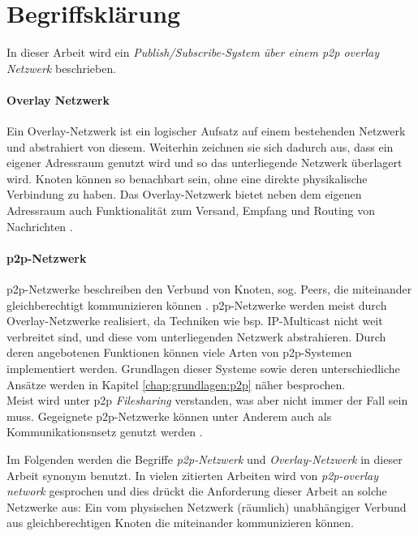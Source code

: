 \section{Begriffsklärung}
In dieser Arbeit wird ein \emph{Publish/Subscribe-System über einem \ac{p2p} overlay Netzwerk} beschrieben.


\paragraph{Overlay Netzwerk} Ein Overlay-Netzwerk ist ein logischer Aufsatz auf einem bestehenden Netzwerk und abstrahiert von diesem. Weiterhin zeichnen sie sich dadurch aus, dass ein eigener Adressraum genutzt wird und so das unterliegende Netzwerk überlagert wird. Knoten können so benachbart sein, ohne eine direkte physikalische Verbindung zu haben. Das Overlay-Netzwerk bietet neben dem eigenen Adressraum auch Funktionalität zum Versand, Empfang und Routing von Nachrichten \cite{Tannenbaum2003}. 

\paragraph{\ac{p2p}-Netzwerk} p2p-Netzwerke beschreiben den Verbund von Knoten, sog. Peers, die miteinander gleichberechtigt kommunizieren können \cite{Steinmetz2005}. p2p-Netzwerke werden meist durch Overlay-Netzwerke realisiert, da Techniken wie bsp. IP-Multicast \cite{Deering1990Multicast} nicht weit verbreitet sind, und diese vom unterliegenden Netzwerk abstrahieren. Durch deren angebotenen Funktionen können viele Arten von p2p-Systemen implementiert werden. Grundlagen dieser Systeme sowie deren unterschiedliche Ansätze werden in Kapitel \ref{chap:grundlagen:p2p} näher besprochen.\\
Meist wird unter p2p \emph{Filesharing} verstanden, was aber nicht immer der Fall sein muss. Gegeignete p2p-Netzwerke können unter Anderem auch als Kommunikationsnsetz genutzt werden \cite{Darlagiannis2006Peertopeer}.

Im Folgenden werden die Begriffe \emph{p2p-Netzwerk} und \emph{Overlay-Netzwerk} in dieser Arbeit synonym benutzt. In vielen zitierten Arbeiten wird von \emph{p2p-overlay network} gesprochen und dies drückt die Anforderung dieser Arbeit an solche Netzwerke aus: Ein vom physischen Netzwerk (räumlich) unabhängiger Verbund aus gleichberechtigen Knoten die miteinander kommunizieren können.

